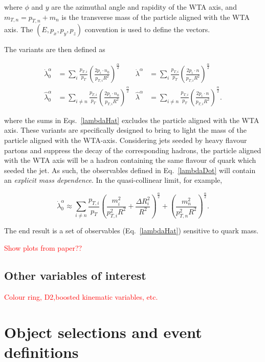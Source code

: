 \documentclass[10pt,a4paper]{book}
\begin{document}
where $\phi$ and $y$ are the azimuthal angle and rapidity of the WTA axis, and $m_{T, n} = p_{T, n} + m_{n}$ is the transverse mass of the particle aligned with the WTA axis. The $(E, p_x, p_y, p_z)$ convention is used to define the vectors.

The variants are then defined as

\begin{align}
\label{lambdaDot}
\dot{\lambda}_0^\alpha &= \sum_i \frac{p_{T,i}}{p_T}\left(\frac{2p_i\cdot n_0}{p_{T,i}R^2} \right)^{\frac{\alpha}{2}}  & 
\dot{\lambda}^\alpha &= \sum_i \frac{p_{T,i}}{p_T}\left(\frac{2p_i\cdot n}{p_{T,i}R^2} \right)^{\frac{\alpha}{2}} \\
\label{lambdaHat}
\hat{\lambda}_0^\alpha &= \sum_{i\neq n} \frac{p_{T,i}}{p_T}\left(\frac{2p_i\cdot n_0}{p_{T,i}R^2} \right)^{\frac{\alpha}{2}}  &
\hat{\lambda}^\alpha &= \sum_{i\neq n} \frac{p_{T,i}}{p_T}\left(\frac{2p_i\cdot n}{p_{T,i}R^2} \right)^{\frac{\alpha}{2}}.
\end{align}

where the sums in Eqs.~\ref{lambdaHat} excludes the particle aligned with the WTA axis. 
These variants are specifically designed to bring to light the mass of the particle aligned with the WTA-axis. Considering jets seeded by heavy flavour partons and suppress the decay of the corresponding hadrons, the particle aligned with the WTA axis will be a hadron containing the same flavour of quark which seeded the jet. As such, the observables defined in Eq.~\ref{lambdaDot} will contain an \emph{explicit mass dependence}. In the quasi-collinear limit, for example,

\begin{equation}
\dot{\lambda}^\alpha_0 \approx \sum_{i \neq n}\frac{p_{T,i}}{p_T}\left(\frac{m_i^2}{p_{T,i}^2R^2} + \frac{\Delta R_i^2}{R^2} \right)^{\frac{\alpha}{2}} + \left(\frac{m_n^2}{p_{T,n}^2R^2} \right)^{\frac{\alpha}{2}}.
\end{equation}

The end result is a set of observables (Eq.~\ref{lambdaHat}) sensitive to quark mass. 

\textcolor{red}{Show plots from paper??}

\subsection{Other variables of interest}
\textcolor{red}{Colour ring, D2,boosted kinematic variables, etc.}

\section{Object selections and event definitions}
\end{document}
